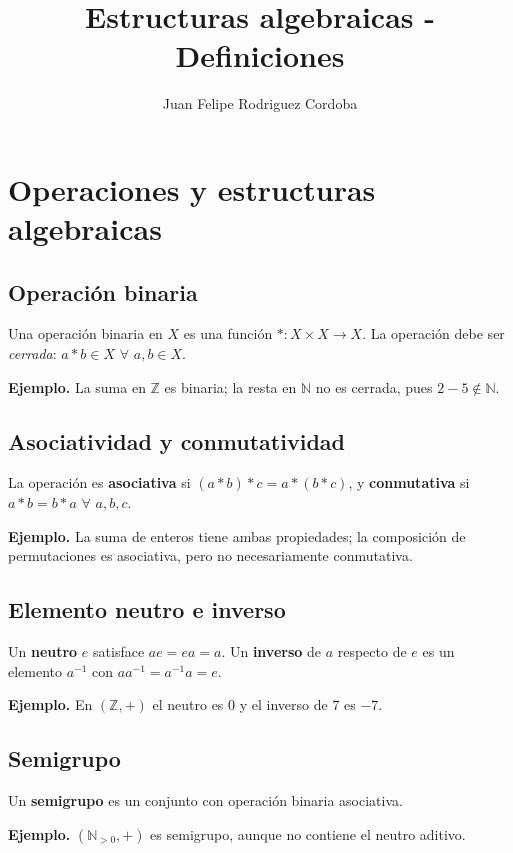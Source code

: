 \documentclass[11pt,a4paper]{article}
\title{Estructuras algebraicas - Definiciones}
\author{Juan Felipe Rodriguez Cordoba}
\date{}
\newcommand{\N}{\mathbb{N}}\newcommand{\Z}{\mathbb{Z}}\newcommand{\Q}{\mathbb{Q}}\newcommand{\R}{\mathbb{R}}\newcommand{\C}{\mathbb{C}}
\begin{document}
\maketitle
\tableofcontents
\newpage
\section{Operaciones y estructuras algebraicas}

\subsection{Operación binaria}
\begin{definicion}
Una operación binaria en $X$ es una función $*:X\times X\to X$. La operación debe ser \emph{cerrada}: $a*b\in X$ $\forall$ $a,b\in X$.
\end{definicion}
\textbf{Ejemplo.} La suma en $\Z$ es binaria; la resta en $\N$ no es cerrada, pues $2-5\notin\N$.


\subsection{Asociatividad y conmutatividad}
\begin{definicion}
La operación es \textbf{asociativa} si $(a*b)*c=a*(b*c)$, y \textbf{conmutativa} si $a*b=b*a$ $\forall$ $a,b,c$.
\end{definicion}
\textbf{Ejemplo.} La suma de enteros tiene ambas propiedades; la composición de permutaciones es asociativa, pero no necesariamente conmutativa.


\subsection{Elemento neutro e inverso}
\begin{definicion}
Un \textbf{neutro} $e$ satisface $ae=ea=a$. Un \textbf{inverso} de $a$ respecto de $e$ es un elemento $a^{-1}$ con $aa^{-1}=a^{-1}a=e$.
\end{definicion}
\textbf{Ejemplo.} En $(\Z,+)$ el neutro es $0$ y el inverso de $7$ es $-7$.


\subsection{Semigrupo}
\begin{definicion}
Un \textbf{semigrupo} es un conjunto con operación binaria asociativa.
\end{definicion}
\textbf{Ejemplo.} $(\N_{>0},+)$ es semigrupo, aunque no contiene el neutro aditivo.
\end{document}
